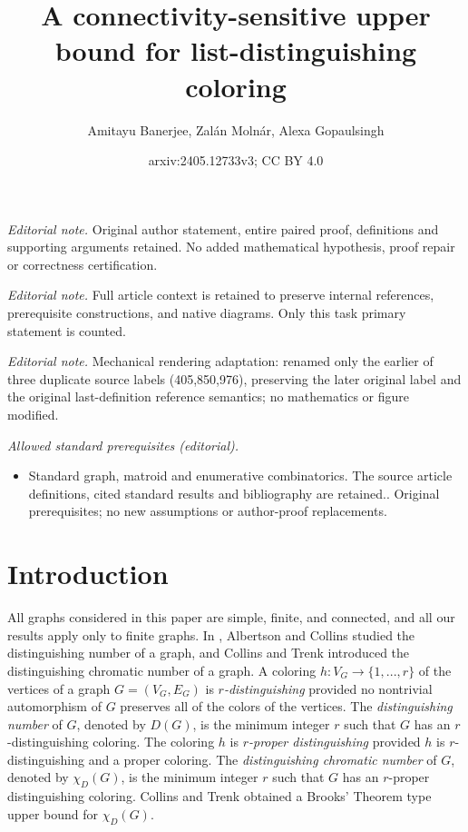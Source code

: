 \documentclass[12pt,reqno,a4paper]{amsart}
\title{A connectivity-sensitive upper bound for list-distinguishing coloring}
\author{Amitayu Banerjee, Zalán Molnár, Alexa Gopaulsingh}
\date{arxiv:2405.12733v3; CC BY 4.0}
\theoremstyle{definition}
\begin{document}
\maketitle
\noindent\textit{Editorial note.} Original author statement, entire paired proof, definitions and supporting arguments retained. No added mathematical hypothesis, proof repair or correctness certification.\par\medskip
\noindent\textit{Editorial note.} Full article context is retained to preserve internal references, prerequisite constructions, and native diagrams. Only this task primary statement is counted.\par\medskip
\noindent\textit{Editorial note.} Mechanical rendering adaptation: renamed only the earlier of three duplicate source labels (405,850,976), preserving the later original label and the original last-definition reference semantics; no mathematics or figure modified.\par\medskip
\noindent\textit{Allowed standard prerequisites (editorial).}\begin{itemize}
\item Standard graph, matroid and enumerative combinatorics. The source article definitions, cited standard results and bibliography are retained.. Original prerequisites; no new assumptions or author-proof replacements.
\end{itemize}\medskip
\section{Introduction}
All graphs considered in this paper are simple, finite, and connected, and all our results apply only to finite graphs. In \cite{AC1996}, Albertson and Collins studied the distinguishing number of a graph, and Collins and Trenk \cite{CT2006} introduced the distinguishing chromatic number of a graph. 
A coloring $h:V_{G}\rightarrow\{1,...,r\}$ of the vertices of a graph $G=(V_{G}, E_{G})$ is {\em $r$-distinguishing} provided no nontrivial automorphism of $G$ preserves all of the colors of the vertices. The {\em distinguishing number} of $G$, denoted by $D(G)$, is the minimum integer $r$ such that $G$ has an $r$-distinguishing coloring. The coloring $h$ is {\em $r$-proper distinguishing} provided $h$ is $r$-distinguishing and a proper coloring. The {\em distinguishing chromatic number} of $G$, denoted by $\chi_{D}(G)$, is the minimum integer $r$ such that $G$ has an $r$-proper distinguishing coloring.
Collins and Trenk \cite{CT2006} obtained a Brooks' Theorem type upper bound for $\chi_{D}(G)$.
\end{document}
